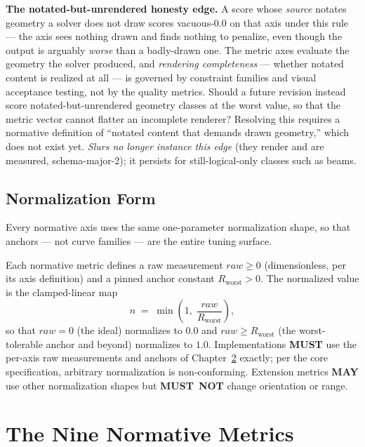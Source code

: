 \documentclass[11pt,letterpaper]{report}
\newcounter{requirement}[chapter]
\newcommand{\MUST}{\textbf{MUST}}
\newcommand{\MUSTNOT}{\textbf{MUST}\nobreak\ \textbf{NOT}}
\newcommand{\MAY}{\textbf{MAY}}
\begin{document}
\begin{openquestion}
\textbf{The notated-but-unrendered honesty edge.} A score whose
\emph{source} notates geometry a solver does not draw scores
vacuous-$0.0$ on that axis under this rule --- the axis sees nothing
drawn and finds nothing to penalize, even though the output is arguably
\emph{worse} than a badly-drawn one. The metric axes evaluate the geometry
the solver produced, and \emph{rendering completeness} --- whether notated
content is realized at all --- is governed by constraint families and
visual acceptance testing, not by the quality metrics. Should a future
revision instead score notated-but-unrendered geometry classes at the
worst value, so that the metric vector cannot flatter an incomplete
renderer? Resolving this requires a normative definition of ``notated
content that demands drawn geometry,'' which does not exist yet.
\emph{Slurs no longer instance this edge} (they render and are measured,
schema-major-2); it persists for still-logical-only classes such as beams.
\end{openquestion}

\section{Normalization Form}
\label{sec:model:normalization}

Every normative axis uses the same one-parameter normalization shape, so
that anchors --- not curve families --- are the entire tuning surface.

\begin{requirement}
\label{req:qmc:normalization-form}
Each normative metric defines a raw measurement
$\mathit{raw} \ge 0$ (dimensionless, per its axis definition) and a pinned
anchor constant $R_{\mathrm{worst}} > 0$. The normalized value is the
clamped-linear map
\[
  n \;=\; \min\!\left(1,\; \frac{\mathit{raw}}{R_{\mathrm{worst}}}\right),
\]
so that $\mathit{raw} = 0$ (the ideal) normalizes to $0.0$ and
$\mathit{raw} \ge R_{\mathrm{worst}}$ (the worst-tolerable anchor and
beyond) normalizes to $1.0$. Implementations \MUST{} use the per-axis raw
measurements and anchors of Chapter~\ref{ch:metrics} exactly; per the core
specification, arbitrary normalization is non-conforming. Extension
metrics \MAY{} use other normalization shapes but \MUSTNOT{} change
orientation or range.
\end{requirement}

\chapter{The Nine Normative Metrics}
\label{ch:metrics}
\end{document}
